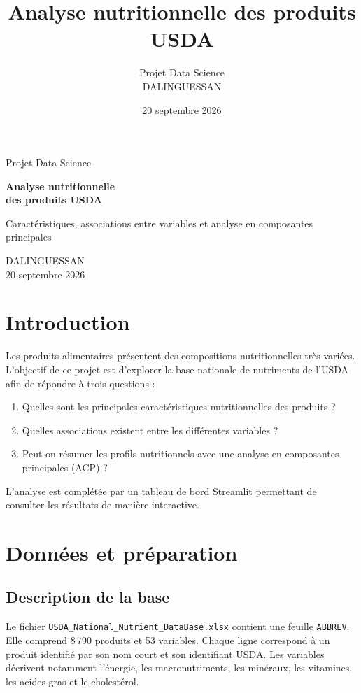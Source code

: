 \documentclass[12pt,a4paper]{article}
\title{\textbf{Analyse nutritionnelle des produits USDA}}
\author{Projet Data Science\\DALINGUESSAN}
\date{20 septembre 2026}
\begin{document}
\begin{titlepage}
    \centering
    \vspace*{2cm}
    {\Large Projet Data Science\par}
    \vspace{1.5cm}
    {\Huge\bfseries Analyse nutritionnelle\\des produits USDA\par}
    \vspace{1.5cm}
    {\large Caractéristiques, associations entre variables et analyse en composantes principales\par}
    \vfill
    {\large DALINGUESSAN\\20 septembre 2026\par}
\end{titlepage}

\tableofcontents
\newpage

\section{Introduction}

Les produits alimentaires présentent des compositions nutritionnelles très variées. L'objectif de ce projet est d'explorer la base nationale de nutriments de l'USDA afin de répondre à trois questions :
\begin{enumerate}[label=\arabic*.]
    \item Quelles sont les principales caractéristiques nutritionnelles des produits ?
    \item Quelles associations existent entre les différentes variables ?
    \item Peut-on résumer les profils nutritionnels avec une analyse en composantes principales (ACP) ?
\end{enumerate}

L'analyse est complétée par un tableau de bord Streamlit permettant de consulter les résultats de manière interactive.

\section{Données et préparation}

\subsection{Description de la base}

Le fichier \texttt{USDA\_National\_Nutrient\_DataBase.xlsx} contient une feuille \texttt{ABBREV}. Elle comprend 8\,790 produits et 53 variables. Chaque ligne correspond à un produit identifié par son nom court et son identifiant USDA. Les variables décrivent notamment l'énergie, les macronutriments, les minéraux, les vitamines, les acides gras et le cholestérol.
\end{document}
